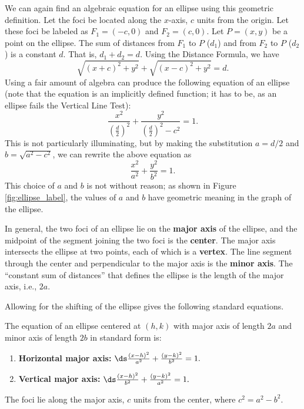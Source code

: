 	We can again find an algebraic equation for an ellipse using this geometric definition. Let the foci be located along the $x$-axis, $c$ units from the origin. Let these foci be labeled as $F_1 = (-c,0)$ and $F_2=(c,0)$. Let $P=(x,y)$ be a point on the ellipse. The sum of distances from $F_1$ to $P$ ($d_1$) and from $F_2$ to $P$ ($d_2$) is a constant $d$. That is, $d_1+d_2=d$. Using the Distance Formula, we have 
	$$\sqrt{(x+c)^2+y^2} + \sqrt{(x-c)^2+y^2} = d.$$ Using a fair amount of algebra can produce the following equation of an ellipse (note that the equation is an implicitly defined function; it has to be, as an ellipse fails the Vertical Line Test):
	$$\frac{x^2}{\left(\frac d2\right)^2} + \frac{y^2}{\left(\frac d2\right)^2-c^2} = 1.$$
	This is not particularly illuminating, but by making the substitution $a=d/2$ and $b=\sqrt{a^2-c^2}$, we can rewrite the above equation as 
	$$\frac{x^2}{a^2} + \frac{y^2}{b^2} = 1.$$ This choice of $a$ and $b$ is not without reason; as shown in Figure \ref{fig:ellipse_label}, the values of $a$ and $b$ have geometric meaning in the graph of the ellipse. 
	
	In general, the two foci of an ellipse lie on the \textbf{major axis} of the ellipse, and the midpoint of the segment joining the two foci is the \textbf{center}. The major axis intersects the ellipse at two points, each of which is a \textbf{vertex}. The line segment through the center and perpendicular to the major axis is the \textbf{minor axis}. The ``constant sum of distances'' that defines the ellipse is the length of the major axis, i.e., $2a$.
	
	Allowing for the shifting of the ellipse gives the following standard equations.
	
	{The equation of an ellipse centered at $(h,k)$ with major axis of length $2a$ and minor axis of length $2b$ in standard form is:
	\begin{enumerate}
	\item	\textbf{Horizontal major axis:} $\ds \frac{(x-h)^2}{a^2}+\frac{(y-k)^2}{b^2}=1.$
	
	\item	\textbf{Vertical major axis:} $\ds \frac{(x-h)^2}{b^2}+\frac{(y-k)^2}{a^2}=1.$
	\end{enumerate}
	The foci lie along the major axis, $c$ units from the center, where $c^2=a^2-b^2$.
	}
	
